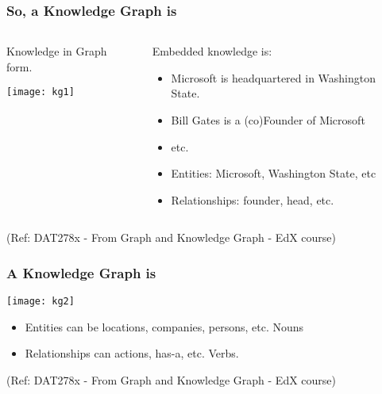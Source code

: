 \begin{frame}\frametitle{So, a Knowledge Graph is}


\begin{columns}
    \begin{column}[T]{0.6\linewidth}

		Knowledge in Graph form.

			\begin{center}
			\texttt{[image: kg1]}
			\end{center}	
    \end{column}
    \begin{column}[T]{0.4\linewidth}
			Embedded knowledge is:
			\begin{itemize}
			\item Microsoft is headquartered in Washington State.
			\item Bill Gates is a (co)Founder of Microsoft
			\item etc.
			\item Entities: Microsoft, Washington State, etc
			\item Relationships: founder, head, etc.
			\end{itemize}
    \end{column}
  \end{columns}
	

  

{\tiny (Ref: DAT278x - From Graph and Knowledge Graph - EdX course)}
\end{frame}


\begin{frame}\frametitle{A Knowledge Graph is}

\begin{center}
\texttt{[image: kg2]}
\end{center}	

\begin{itemize}
\item Entities can be locations, companies, persons, etc. Nouns
\item Relationships can actions, has-a, etc. Verbs.
\end{itemize}


{\tiny (Ref: DAT278x - From Graph and Knowledge Graph - EdX course)}
\end{frame}

